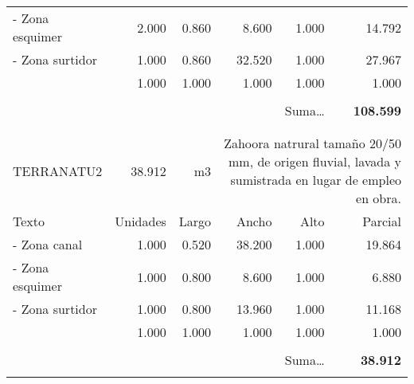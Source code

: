 \documentclass{book}%
\begin{document}
\begin{longtable}{lrrrrr}
\multicolumn{1}{p{3.5cm}}{{-} Zona esquimer}&2.000&0.860&8.600&1.000&14.792\\%
\multicolumn{1}{p{3.5cm}}{{-} Zona surtidor}&1.000&0.860&32.520&1.000&27.967\\%
\multicolumn{1}{p{3.5cm}}{}&1.000&1.000&1.000&1.000&1.000\\%
&&&&&\\%
\multicolumn{5}{r}{Suma\ldots}&\textbf{108.599}\\%
\hline%
&&&&&\\%
&&&&&\\%
TERRANATU2&38.912& m3&\multicolumn{3}{p{6cm}}{\scriptsize Zahoora natrural tamaño 20/50 mm, de origen fluvial, lavada y sumistrada en lugar de empleo en obra.\normalsize}\\%
Texto&Unidades&Largo&Ancho&Alto&Parcial\\%
\hline%
\multicolumn{1}{p{3.5cm}}{{-} Zona canal}&1.000&0.520&38.200&1.000&19.864\\%
\multicolumn{1}{p{3.5cm}}{{-} Zona esquimer}&1.000&0.800&8.600&1.000&6.880\\%
\multicolumn{1}{p{3.5cm}}{{-} Zona surtidor}&1.000&0.800&13.960&1.000&11.168\\%
\multicolumn{1}{p{3.5cm}}{}&1.000&1.000&1.000&1.000&1.000\\%
&&&&&\\%
\multicolumn{5}{r}{Suma\ldots}&\textbf{38.912}\\%
\hline%
&&&&&\\%
\end{longtable}%
\newpage%
\end{document}

